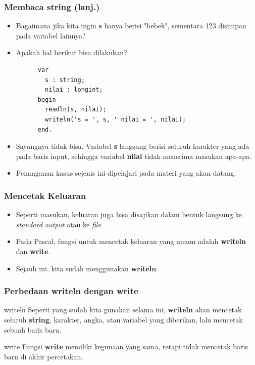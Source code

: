 \begin{frame}[fragile]
\frametitle{Membaca string (lanj.)}
\begin{itemize}
  \item Bagaimana jika kita ingin \textbf{s} hanya berisi "bebek", sementara 123 disimpan pada variabel lainnya?
  \item Apakah hal berikut bisa dilakukan?
    \begin{lstlisting}
      var
        s : string;
        nilai : longint;
      begin
        readln(s, nilai);
        writeln('s = ', s, ' nilai = ', nilai);
      end.
    \end{lstlisting}
  \item Sayangnya tidak bisa. Variabel \textbf{s} langsung berisi seluruh karakter yang ada pada baris input, sehingga variabel \textbf{nilai} tidak menerima masukan apa-apa.
  \item Penanganan kasus sejenis ini dipelajari pada materi yang akan datang.  
\end{itemize}
\end{frame}

\begin{frame}
\frametitle{Mencetak Keluaran}
\begin{itemize}
  \item Seperti masukan, keluaran juga bisa disajikan dalam bentuk langsung ke \textit{standard output} atau ke \textit{file}.
  \item Pada Pascal, fungsi untuk mencetak keluaran yang umum adalah \alert{\textbf{writeln}} dan \alert{\textbf{write}}.
  \item Sejauh ini, kita sudah menggunakan \textbf{writeln}.
\end{itemize}
\end{frame}

\begin{frame}[fragile]
\frametitle{Perbedaan writeln dengan write}
\begin{block}{writeln}
  Seperti yang sudah kita gunakan selama ini, \textbf{writeln} akan mencetak seluruh \textbf{string}, karakter, angka, atau variabel yang diberikan, lalu \alert{mencetak} sebuah baris baru.
\end{block}
\begin{block}{write}
  Fungsi \textbf{write} memiliki kegunaan yang sama, tetapi \alert{tidak mencetak} baris baru di akhir percetakan,
\end{block}
\end{frame}

